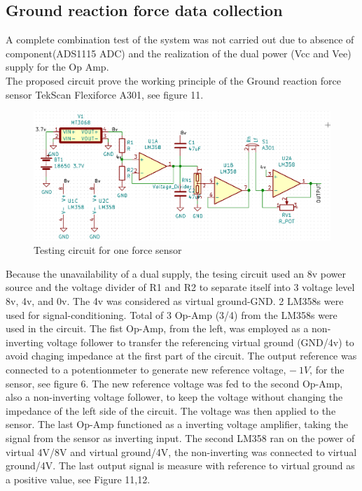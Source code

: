 \documentclass[12pt,a4paper]{article}
\begin{document}
\subsection{Ground reaction force data collection}
A complete combination test of the system was not carried out due to absence of component(ADS1115 ADC) and the realization of the dual power (Vcc and Vee) supply for the Op Amp.\\
The proposed circuit prove the working principle of the Ground reaction force sensor TekScan Flexiforce A301, see figure 11.
\begin{figure}[hbt!]
\begin{center}
\includegraphics[width = 170mm]{lm358test.png}
\caption{Testing circuit for one force sensor}
\end{center}
\end{figure}
Because the unavailability of a dual supply, the tesing circuit used an 8v power source and the voltage divider of R1 and R2 to separate itself into 3 voltage level 8v, 4v, and 0v. The 4v was considered as virtual ground-GND. 2 LM358s were used for signal-conditioning. Total of 3 Op-Amp (3/4) from the LM358s were used in the circuit. The fist Op-Amp, from the left, was employed as a non-inverting voltage follower to transfer the referencing virtual ground (GND/4v) to avoid chaging impedance at the first part of the circuit. The output reference was connected to a potentionmeter to generate new reference voltage, $-\:1V$, for the sensor, see figure 6. The new reference voltage was fed to the second Op-Amp, also a non-inverting voltage follower, to keep the voltage without changing the impedance of the left side of the circuit. The voltage was then applied to the sensor. The last Op-Amp functioned as a inverting voltage amplifier, taking the signal from the sensor as inverting input. The second LM358 ran on the power of virtual 4V/8V and virtual ground/4V, the non-inverting was connected to virtual ground/4V. The last output signal is measure with reference to virtual ground as a positive value, see Figure 11,12.\\
\end{document}
